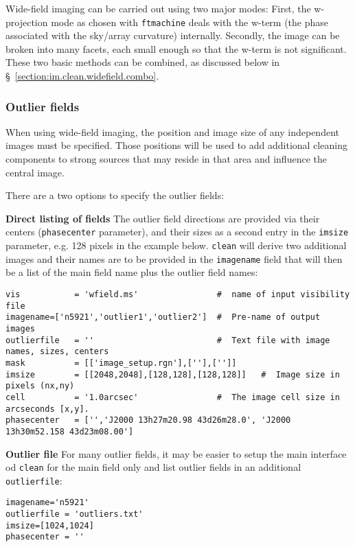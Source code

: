 Wide-field imaging can be carried out using two major modes: First, the
w-projection mode as chosen with {\tt ftmachine} deals with the w-term
(the phase associated with the sky/array curvature) internally.  Secondly, the image can be
broken into many facets, each small enough so that the w-term is not
significant.  These two basic methods can be combined, as discussed
below in \S~\ref{section:im.clean.widefield.combo}.

\subsubsection{Outlier fields}
\label{section:im.clean.widefield.outliers}

When using wide-field imaging, the position and image size of any
independent images must be specified. Those positions will be used to
add additional cleaning components to strong sources that may reside
in that area and influence the central image.

There are a two options to specify the outlier fields:



{\bf Direct listing of fields} The outlier field directions are
provided via their centers ({\tt phasecenter} parameter), and their
sizes as a second entry in the {\tt imsize} parameter, e.g. 128 pixels
in the example below. {\tt clean} will derive two additional images
and their names are to be provided in the {\tt imagename} field that
will then be a list of the main field name plus the outlier field
names:

\small
\begin{verbatim}
vis           = 'wfield.ms'                #  name of input visibility file
imagename=['n5921','outlier1','outlier2']  #  Pre-name of output images
outlierfile   = ''                         #  Text file with image names, sizes, centers
mask          = [['image_setup.rgn'],[''],['']] 
imsize        = [[2048,2048],[128,128],[128,128]]   #  Image size in pixels (nx,ny)
cell          = '1.0arcsec'                #  The image cell size in arcseconds [x,y].
phasecenter   = ['','J2000 13h27m20.98 43d26m28.0', 'J2000 13h30m52.158 43d23m08.00']
\end{verbatim}
\normalsize

{\bf Outlier file} For many outlier fields, it may be easier to setup
the main interface od {\tt clean} for the main field only and list
outlier fields in an additional {\tt outlierfile}:


\small
\begin{verbatim}
imagename='n5921'
outlierfile = 'outliers.txt'
imsize=[1024,1024]
phasecenter = ''
\end{verbatim}
\normalsize

